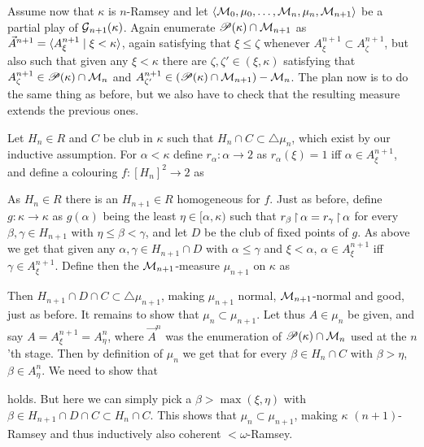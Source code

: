 \documentclass[../../main]{subfiles}
\begin{document}
{	\qquad Assume now that $\kappa$ is $n$-Ramsey and let $\langle \operatorname{\mathcal M}_0,\mu_0,\hdots,\operatorname{\mathcal M}_n,\mu_n,\operatorname{\mathcal M}_{n+1}\rangle$ be a partial play of $\operatorname{\mathcal G}_{n+1}(\kappa)$. Again enumerate $\mathscr P(\kappa)\cap\operatorname{\mathcal M}_{n+1}$ as $\vec A^{n+1}=\langle A^{n+1}_\xi\mid\xi<\kappa\rangle$, again satisfying that $\xi\leq\zeta$ whenever $A^{n+1}_\xi\subset A^{n+1}_\zeta$, but also such that given any $\xi<\kappa$ there are $\zeta,\zeta'\in(\xi,\kappa)$ satisfying that $A^{n+1}_\zeta\in\mathscr P(\kappa)\cap\operatorname{\mathcal M}_n$ and $A^{n+1}_{\zeta'}\in(\mathscr P(\kappa)\cap\operatorname{\mathcal M}_{n+1})-\operatorname{\mathcal M}_n$. The plan now is to do the same thing as before, but we also have to check that the resulting measure extends the previous ones.

	\qquad Let $H_n\in R$ and $C$ be club in $\kappa$ such that $H_n\cap C\subset\triangle\mu_n$, which exist by our inductive assumption. For $\alpha<\kappa$ define $r_\alpha:\alpha\to 2$ as $r_\alpha(\xi)=1$ iff $\alpha\in A^{n+1}_\xi$, and define a colouring $f:[H_n]^2\to 2$ as

	As $H_n\in R$ there is an $H_{n+1}\in R$ homogeneous for $f$. Just as before, define $g:\kappa\to\kappa$ as $g(\alpha)$ being the least $\eta\in[\alpha,\kappa)$ such that $r_\beta\operatorname{\upharpoonright}\alpha=r_\gamma\operatorname{\upharpoonright}\alpha$ for every $\beta,\gamma\in H_{n+1}$ with $\eta\leq\beta<\gamma$, and let $D$ be the club of fixed points of $g$. As above we get that given any $\alpha,\gamma\in H_{n+1}\cap D$ with $\alpha\leq\gamma$ and $\xi<\alpha$, $\alpha\in A^{n+1}_\xi$ iff $\gamma\in A^{n+1}_\xi$. Define then the $\operatorname{\mathcal M}_{n+1}$-measure $\mu_{n+1}$ on $\kappa$ as

	Then $H_{n+1}\cap D\cap C\subset\triangle\mu_{n+1}$, making $\mu_{n+1}$ normal, $\operatorname{\mathcal M}_{n+1}$-normal and good, just as before. It remains to show that $\mu_n\subset\mu_{n+1}$. Let thus $A\in\mu_n$ be given, and say $A=A^{n+1}_\xi=A^n_\eta$, where $\vec A^n$ was the enumeration of $\mathscr P(\kappa)\cap\operatorname{\mathcal M}_n$ used at the $n$'th stage. Then by definition of $\mu_n$ we get that for every $\beta\in H_n\cap C$ with $\beta>\eta$, $\beta\in A^n_\eta$. We need to show that

	holds. But here we can simply pick a $\beta>\max(\xi,\eta)$ with $\beta\in H_{n+1}\cap D\cap C\subset H_n\cap C$. This shows that $\mu_n\subset\mu_{n+1}$, making $\kappa$ $(n{+}1)$-Ramsey and thus inductively also coherent ${<}\omega$-Ramsey.
}
\end{document}
